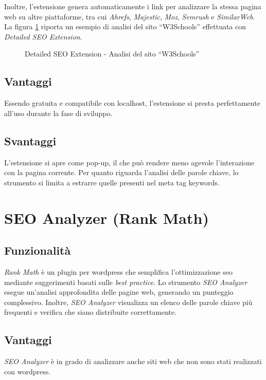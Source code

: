 \vspace{5pt}
\noindent Inoltre, l'estensione genera automaticamente i link per analizzare la stessa pagina web su altre piattaforme, tra cui \textit{Ahrefs}, \textit{Majestic}, \textit{Moz}, \textit{Semrush} e \textit{SimilarWeb}. La figura \ref{fig:detailed_seo_extension_w3schools} riporta un esempio di analisi del sito “W3Schools” effettuata con \textit{Detailed SEO Extension}.
 
\begin{figure}[H]
    \centering 
    \caption{Detailed SEO Extension - Analisi del sito “W3Schools”}
    \label{fig:detailed_seo_extension_w3schools}
\end{figure}

\subsection{Vantaggi}
Essendo gratuita e compatibile con \gls{localhost}, l'estensione si presta perfettamente all'uso durante la fase di sviluppo.

\subsection{Svantaggi}
L'estensione si apre come pop-up, il che può rendere meno agevole l'interazione con la pagina corrente. Per quanto riguarda l'analisi delle parole chiave, lo strumento si limita a estrarre quelle presenti nel meta tag keywords.

\section{SEO Analyzer (Rank Math)}

\subsection{Funzionalità}
\textit{Rank Math} è un plugin per \gls{wordpress} che semplifica l'ottimizzazione \gls{seo} mediante suggerimenti basati sulle \textit{best practice}. Lo strumento \textit{SEO Analyzer} esegue un'analisi approfondita delle pagine web, generando un punteggio complessivo. Inoltre, \textit{SEO Analyzer} visualizza un elenco delle parole chiave più frequenti e verifica che siano distribuite correttamente.

\subsection{Vantaggi}
\textit{SEO Analyzer} è in grado di analizzare anche siti web che non sono stati realizzati con \gls{wordpress}.

